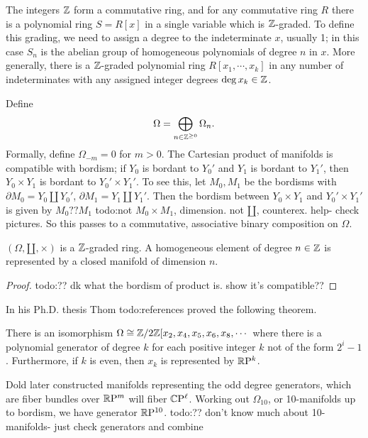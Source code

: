 \begin{example}
    The integers $\mathbb{Z}$ form a commutative ring, and for any commutative ring $R$ there is a polynomial ring $S=R[x]$ in a single variable which is $\mathbb{Z}$-graded. To define this grading, we need to assign a degree to the indeterminate $x$, usually 1; in this case $S_n $ is the abelian group of homogeneous polynomials of degree $n$ in $x$. More generally, there is a $\mathbb{Z}$-graded polynomial ring $R[x_1,\cdots ,x_k]$ in any number of indeterminates with any assigned integer degrees $\deg x_k \in \mathbb{Z}$.
\end{example}
    Define \[
    \Omega=\bigoplus _{n \in \mathbb{Z}^{\geq 0}}\Omega_n .
    \] Formally, define $\Omega_{-m}=0$ for $m>0$. The Cartesian product of manifolds is compatible with bordism; if $Y_0$ is bordant to $Y_0'$ and $Y_1$ is bordant to $Y_1'$, then $Y_0 \times Y_1$ is bordant to $Y_0' \times Y_1'$. To see this, let $M_0,M_1$ be the bordisms with $\partial M_0=Y_0\amalg Y_0'$, $\partial M_1=Y_1\amalg Y_1'$. Then the bordism between $Y_0 \times Y_1$ and $Y_0' \times Y_1'$ is given by $M_0 ?? M_1$ {\color{red}todo:not $M_0 \times M_1$, dimension. not $\amalg$, counterex. help- check pictures}. So this passes to a commutative, associative binary composition on $\Omega$.
    \begin{prop}
        $(\Omega,\amalg, \times )$ is a $\mathbb{Z}$-graded ring. A homogeneous element of degree $n \in \mathbb{Z}$ is represented by a closed manifold of dimension $n$.
    \end{prop}
    \begin{proof}
        {\color{red}todo:?? dk what the bordism of product is. show it's compatible??} 
    \end{proof}
    In his Ph.D. thesis Thom {\color{red}todo:references} proved the following theorem.
    \begin{theorem}[Thom]
        There is an isomorphism $\Omega \cong \mathbb{Z} /2 \mathbb{Z} [x_2,x_4, x_5,x_6, x_8,\cdots $ where there is a polynomial generator of degree $k$ for each positive integer $k$ not of the form $2^i -1$. Furthermore, if $k$ is even, then $x_k$ is represented by $\mathbb{R} \mathrm P^k$. 
    \end{theorem}
    Dold later constructed manifolds representing the odd degree generators, which are fiber bundles over $\mathbb{R} \mathrm P^m$ will fiber $\mathbb{C} \mathrm{P}^{\ell} $. Working out $\Omega_{10}$, or 10-manifolds up to bordism, we have generator $\mathbb{R}\mathrm{P}^{10}$. {\color{red}todo:?? don't know much about 10-manifolds- just check generators and combine} 

